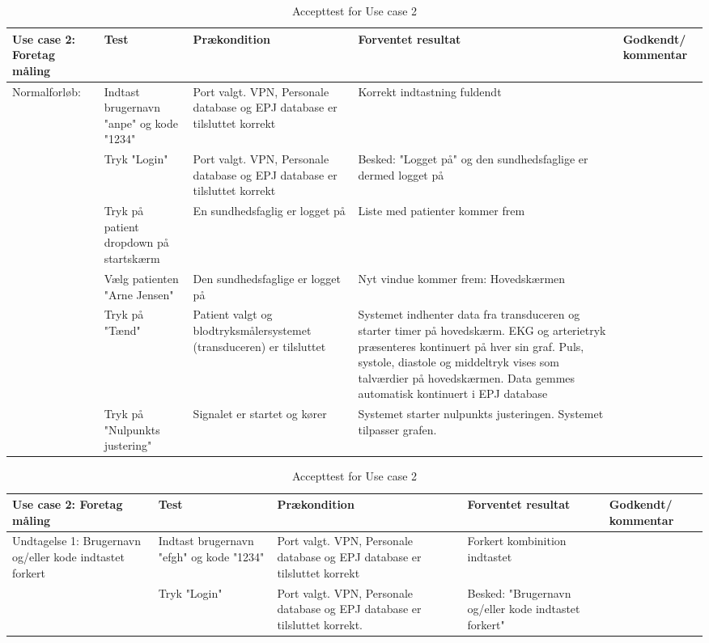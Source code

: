 \begin{table}[H]
\caption{Accepttest for Use case 2}\label{tab:tabel9}
\begin{tabular}{|>{\raggedright\arraybackslash}p{2.5cm}| >{\raggedright\arraybackslash}p{2.9cm} | >{\raggedright\arraybackslash}p{2.9cm} | >{\raggedright\arraybackslash}p{2.9cm} | >{\raggedright\arraybackslash}p{2.8cm} |}
   \hline
   \textbf{Use case 2: Foretag måling} &\textbf{Test}& \textbf{Prækondition} & \textbf{Forventet resultat} & \textbf{Godkendt/ kommentar}\\ \hline
   Normalforløb:& Indtast brugernavn "anpe" og kode "1234" & Port valgt. VPN, Personale database og EPJ database er tilsluttet korrekt & Korrekt indtastning fuldendt & \\\hline
   &Tryk "Login" & Port valgt. VPN, Personale database og EPJ database er tilsluttet korrekt & Besked: "Logget på" og den sundhedsfaglige er dermed logget på &\\\hline
   &Tryk på patient dropdown på startskærm & En sundhedsfaglig er logget på & Liste med patienter kommer frem  & \\\hline
   & Vælg patienten "Arne Jensen" & Den sundhedsfaglige er logget på & Nyt vindue kommer frem: Hovedskærmen &\\\hline
   & Tryk på "Tænd"& Patient valgt og blodtryksmålersystemet (transduceren) er tilsluttet & Systemet indhenter data fra transduceren og starter timer på hovedskærm. EKG og arterietryk præsenteres kontinuert på hver sin graf. Puls, systole, diastole og middeltryk vises som talværdier på hovedskærmen. Data gemmes automatisk kontinuert i EPJ database & \\\hline
   & Tryk på "Nulpunkts justering" & Signalet er startet og kører & Systemet starter nulpunkts justeringen. Systemet tilpasser grafen. &\\\hline
\end{tabular}
\end{table}



\begin{table}[H]
\caption{Accepttest for Use case 2}\label{tab:tabel10}
\begin{tabular}{|>{\raggedright\arraybackslash}p{2.5cm}| >{\raggedright\arraybackslash}p{2.9cm} | >{\raggedright\arraybackslash}p{2.9cm} | >{\raggedright\arraybackslash}p{2.9cm} | >{\raggedright\arraybackslash}p{2.8cm} |}
   \hline
   \textbf{Use case 2: Foretag måling} &\textbf{Test}& \textbf{Prækondition} & \textbf{Forventet resultat} & \textbf{Godkendt/ kommentar}\\ \hline
   Undtagelse 1: Brugernavn og/eller kode indtastet forkert & Indtast brugernavn "efgh" og kode "1234"& Port valgt. VPN, Personale database og EPJ database er tilsluttet korrekt & Forkert kombinition indtastet &  \\\hline
   &Tryk "Login" & Port valgt. VPN, Personale database og EPJ database er tilsluttet korrekt. & Besked: "Brugernavn og/eller kode indtastet forkert" &\\\hline
\end{tabular}
\end{table}



